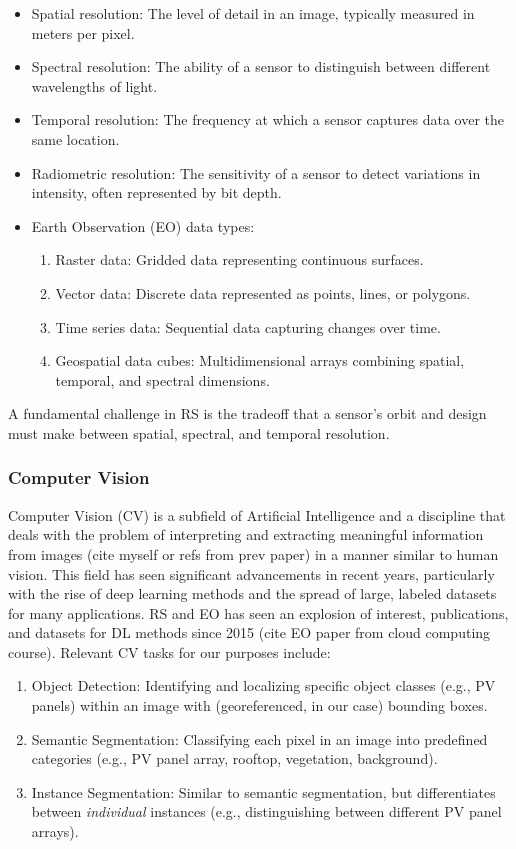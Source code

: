 \begin{multicols}{2}
\begin{itemize}
    \item Spatial resolution: The level of detail in an image, typically measured in meters per pixel.
    \item Spectral resolution: The ability of a sensor to distinguish between different wavelengths of light.
    \item Temporal resolution: The frequency at which a sensor captures data over the same location.
    \item Radiometric resolution: The sensitivity of a sensor to detect variations in intensity, often represented by bit depth.
    \item Earth Observation (EO) data types:
        \begin{enumerate}
            \item Raster data: Gridded data representing continuous surfaces.
            \item Vector data: Discrete data represented as points, lines, or polygons.
            \item Time series data: Sequential data capturing changes over time.
            \item Geospatial data cubes: Multidimensional arrays combining spatial, temporal, and spectral dimensions.
        \end{enumerate}
\end{itemize}

A fundamental challenge in RS is the tradeoff that a sensor's orbit and design must make between spatial, spectral, and temporal resolution. 

\subsubsection{Computer Vision}

Computer Vision (CV) is a subfield of Artificial Intelligence and a discipline that deals with the problem of interpreting and extracting meaningful information from images (cite myself or refs from prev paper) 
in a manner similar to human vision. This field has seen significant advancements in recent years, particularly with the rise of deep learning methods and the spread of large, labeled datasets for many applications. 
RS and EO has seen an explosion of interest, publications, and datasets for DL methods since 2015 (cite EO paper from cloud computing course). Relevant CV tasks for our purposes include:

\begin{enumerate}
    \item Object Detection: Identifying and localizing specific object classes (e.g., PV panels) within an image with (georeferenced, in our case) bounding boxes.
    \item Semantic Segmentation: Classifying each pixel in an image into predefined categories (e.g., PV panel array, rooftop, vegetation, background).
    \item Instance Segmentation: Similar to semantic segmentation, but differentiates between \textit{individual} instances (e.g., distinguishing between different PV panel arrays). 
\end{enumerate}


\end{multicols}

